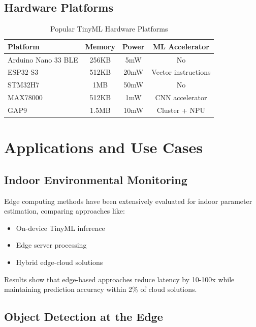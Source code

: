 \documentclass[12pt,a4paper]{article}
\begin{document}
\subsection{Hardware Platforms}

\begin{table}[H]
\centering
\caption{Popular TinyML Hardware Platforms}
\begin{tabular}{lccc}
\toprule
\textbf{Platform} & \textbf{Memory} & \textbf{Power} & \textbf{ML Accelerator} \\
\midrule
Arduino Nano 33 BLE & 256KB & 5mW & No \\
ESP32-S3 & 512KB & 20mW & Vector instructions \\
STM32H7 & 1MB & 50mW & No \\
MAX78000 & 512KB & 1mW & CNN accelerator \\
GAP9 & 1.5MB & 10mW & Cluster + NPU \\
\bottomrule
\end{tabular}
\end{table}

\section{Applications and Use Cases}

\subsection{Indoor Environmental Monitoring}

Edge computing methods have been extensively evaluated for indoor parameter estimation, comparing approaches like:
\begin{itemize}
    \item On-device TinyML inference
    \item Edge server processing
    \item Hybrid edge-cloud solutions
\end{itemize}

Results show that edge-based approaches reduce latency by 10-100x while maintaining prediction accuracy within 2\% of cloud solutions.

\subsection{Object Detection at the Edge}
\end{document}
